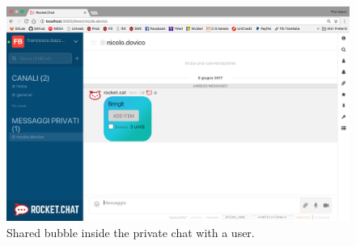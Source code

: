 \begin{figure}[H]
  \centering 
  \includegraphics[width=\textwidth]{Sections/3-HowToUse/Images/share_user_private_chat_message.png}
  \caption{Shared bubble inside the private chat with a user.}
\end{figure}


